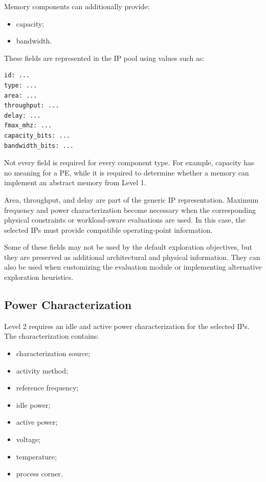 Memory components can additionally provide:

\begin{itemize}
    \item capacity;
    \item bandwidth.
\end{itemize}

These fields are represented in the IP pool using values such as:

\begin{verbatim}
id: ...
type: ...
area: ...
throughput: ...
delay: ...
fmax_mhz: ...
capacity_bits: ...
bandwidth_bits: ...
\end{verbatim}

Not every field is required for every component type. For example,
capacity has no meaning for a PE, while it is required to determine
whether a memory can implement an abstract memory from Level 1.

Area, throughput, and delay are part of the generic IP
representation. Maximum frequency and power characterization become
necessary when the corresponding physical constraints or
workload-aware evaluations are used. In this case, the selected IPs
must provide compatible operating-point information.

Some of these fields may not be used by the default exploration
objectives, but they are preserved as additional architectural and
physical information. They can also be used when customizing the
evaluation module or implementing alternative exploration
heuristics.


\subsection{Power Characterization}

Level 2 requires an idle and active power characterization for the
selected IPs. The characterization contains:

\begin{itemize}
    \item characterization source;
    \item activity method;
    \item reference frequency;
    \item idle power;
    \item active power;
    \item voltage;
    \item temperature;
    \item process corner.
\end{itemize}

